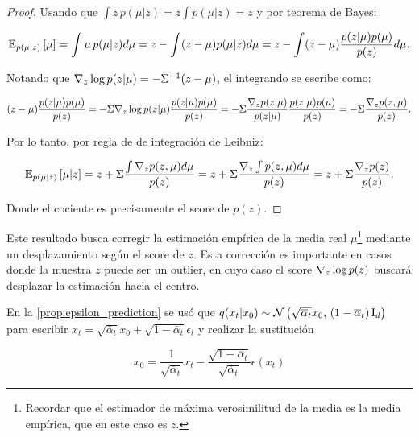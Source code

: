 \begin{proof}
    Usando que $\int z\,p(\mu|z) = z\int p(\mu|z)=z$ y por teorema de Bayes:

    \begin{equation*}
        \mathbb{E}_{p(\mu|z)}\left[\mu\right] = \int \mu\, p(\mu|z)d\mu = z - \int (z-\mu)p(\mu|z) d\mu = z - \int (z-\mu)\frac{p(z|\mu)p(\mu)}{p(z)} d\mu .
    \end{equation*}

    Notando que $\nabla_{z} \log p(z|\mu) = -\Sigma^{-1} (z-\mu)$, el integrando se escribe como:

    \begin{equation*}
        (z-\mu)\frac{p(z|\mu)p(\mu)}{p(z)} = -\Sigma \nabla_{z} \log p(z|\mu) \frac{p(z|\mu)p(\mu)}{p(z)} = -\Sigma \frac{\nabla_z p(z|\mu)}{p(z|\mu)} \frac{p(z|\mu)p(\mu)}{p(z)} = -\Sigma \frac{\nabla_z p(z,\mu)}{p(z)} .
    \end{equation*}

    Por lo tanto, por regla de de integración de Leibniz:

    \begin{equation*}
        \mathbb{E}_{p(\mu|z)}\left[\mu|z\right] = z + \Sigma \frac{\int \nabla_z p(z,\mu)d\mu}{p(z)} = z + \Sigma \frac{\nabla_z \int p(z,\mu)d\mu}{p(z)} = z + \Sigma \frac{\nabla_z p(z)}{p(z)} .
    \end{equation*}

    Donde el cociente es precisamente el score de $p(z)$.
\end{proof}

Este resultado busca corregir la estimación empírica de la media real $\mu$\footnote{Recordar que el estimador de máxima verosimilitud de la media es la media empírica, que en este caso es $z$.} mediante un desplazamiento según el score de $z$. Esta corrección es importante en casos donde la muestra $z$ puede ser un outlier, en cuyo caso el score $\nabla_{z} \log p(z)$ buscará desplazar la estimación hacia el centro.

En la \autoref{prop:epsilon_prediction} se usó que $q(x_t|x_0)\sim\mathcal{N}\left(\sqrt{\overline{\alpha}_t}x_0,\,(1-\overline{\alpha}_t)\operatorname{I}_{d}\right)$ para escribir $x_t=\sqrt{\bar\alpha_t} x_0 + \sqrt{1-\bar\alpha_t} \epsilon_t$ y realizar la sustitución

\begin{equation}
    \label{eq:x0_epsilon_prediction}
    x_0 = \frac{1}{\sqrt{\overline{\alpha}_t}} x_t - \frac{\sqrt{1-\overline{\alpha}_t}}{\sqrt{\overline{\alpha}_t}}\epsilon(x_t)
\end{equation}

